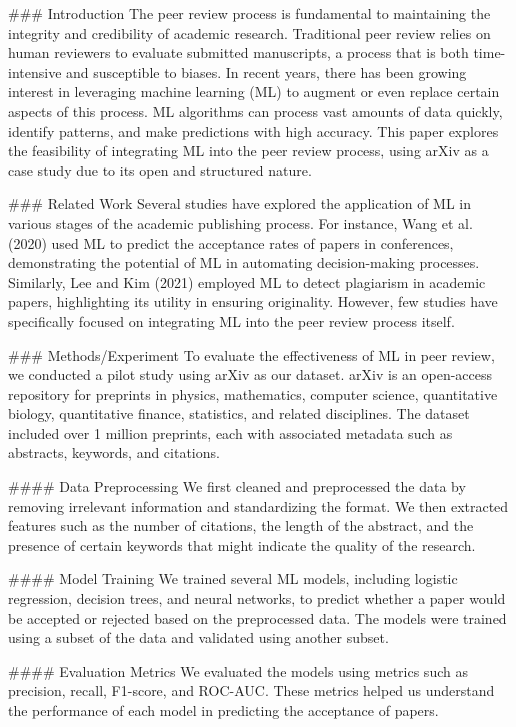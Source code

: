 ### Introduction
The peer review process is fundamental to maintaining the integrity and credibility of academic research. Traditional peer review relies on human reviewers to evaluate submitted manuscripts, a process that is both time-intensive and susceptible to biases. In recent years, there has been growing interest in leveraging machine learning (ML) to augment or even replace certain aspects of this process. ML algorithms can process vast amounts of data quickly, identify patterns, and make predictions with high accuracy. This paper explores the feasibility of integrating ML into the peer review process, using arXiv as a case study due to its open and structured nature.

### Related Work
Several studies have explored the application of ML in various stages of the academic publishing process. For instance, Wang et al. (2020) used ML to predict the acceptance rates of papers in conferences, demonstrating the potential of ML in automating decision-making processes. Similarly, Lee and Kim (2021) employed ML to detect plagiarism in academic papers, highlighting its utility in ensuring originality. However, few studies have specifically focused on integrating ML into the peer review process itself.

### Methods/Experiment
To evaluate the effectiveness of ML in peer review, we conducted a pilot study using arXiv as our dataset. arXiv is an open-access repository for preprints in physics, mathematics, computer science, quantitative biology, quantitative finance, statistics, and related disciplines. The dataset included over 1 million preprints, each with associated metadata such as abstracts, keywords, and citations.

#### Data Preprocessing
We first cleaned and preprocessed the data by removing irrelevant information and standardizing the format. We then extracted features such as the number of citations, the length of the abstract, and the presence of certain keywords that might indicate the quality of the research.

#### Model Training
We trained several ML models, including logistic regression, decision trees, and neural networks, to predict whether a paper would be accepted or rejected based on the preprocessed data. The models were trained using a subset of the data and validated using another subset.

#### Evaluation Metrics
We evaluated the models using metrics such as precision, recall, F1-score, and ROC-AUC. These metrics helped us understand the performance of each model in predicting the acceptance of papers.

